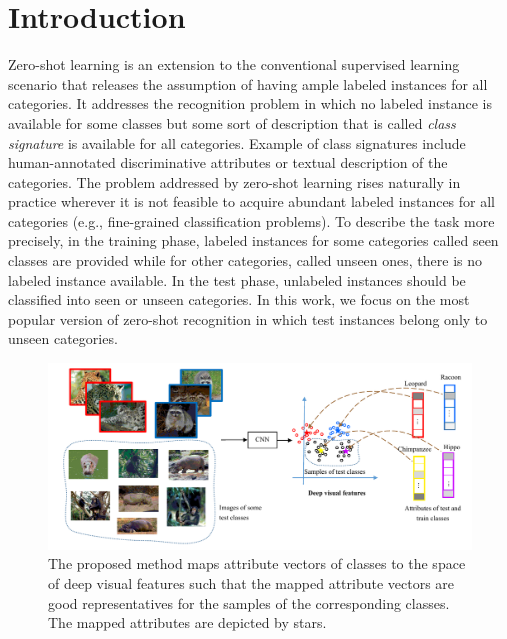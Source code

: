 \documentclass[10pt,twocolumn,letterpaper]{article}
\begin{document}
\section{Introduction}
Zero-shot learning \cite{bengio08,hinton09,lampert09,farhadi09} is an extension to the conventional supervised learning scenario
that releases the assumption of having ample labeled instances for all categories. It addresses the
recognition problem in which no labeled instance is available for some classes but
some sort of description that is called \textit{class signature} is available for all categories.
Example of class signatures include human-annotated discriminative attributes or textual description of the categories.
The problem addressed by zero-shot learning rises naturally in practice wherever it is not feasible to acquire abundant labeled instances for
 all categories (e.g., fine-grained classification problems).
To describe the task more precisely, in the training phase, labeled instances for some categories called seen classes are provided
while for other categories, called unseen ones, there is no labeled instance available.
In the test phase, unlabeled instances should be classified into seen or unseen categories.
 In this work, we focus on the most popular version of zero-shot recognition in which test instances belong only to unseen categories.
 \begin{figure}[t]
 \begin{center}
 \includegraphics[width=2\columnwidth]{FigOverview.pdf}%
\caption{The proposed method maps attribute vectors of classes to the space of deep visual features such that the mapped attribute vectors are good representatives for the samples of the corresponding classes. The mapped attributes are depicted by stars.}
 \label{fig:overview}
 \end{center}
 \end{figure}
\end{document}
